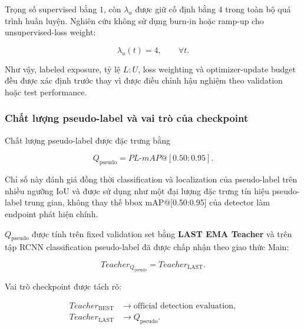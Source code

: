 \documentclass[pdflatex,sn-mathphys-num]{sn-jnl}%
\theoremstyle{thmstyleone}%
\theoremstyle{thmstyletwo}%
\theoremstyle{thmstylethree}%
\begin{document}
Trọng số supervised bằng \(1\), còn \(\lambda_u\) được giữ cố định bằng
\(4\) trong toàn bộ quá trình huấn luyện. Nghiên cứu không sử dụng burn-in
hoặc ramp-up cho unsupervised-loss weight:

\begin{equation}
\lambda_u(t)=4,
\qquad
\forall t.
\label{eq:ssl_constant_unsupervised_weight}
\end{equation}

Như vậy, labeled exposure, tỷ lệ \(L:U\), loss weighting và
optimizer-update budget đều được xác định trước thay vì được điều chỉnh hậu
nghiệm theo validation hoặc test performance.

\subsubsection{Chất lượng pseudo-label và vai trò của checkpoint}
\label{subsubsec:pseudo_label_quality}
\label{subsubsec:qpseudo_checkpoint}

Chất lượng pseudo-label được đặc trưng bằng

\begin{equation}
Q_{\mathrm{pseudo}}
=
PL\text{-}mAP@[0.50:0.95].
\label{eq:pseudo_quality_metric}
\end{equation}

Chỉ số này đánh giá đồng thời classification và localization của
pseudo-label trên nhiều ngưỡng IoU và được sử dụng như một đại lượng đặc trưng tín hiệu pseudo-label trung gian, không thay thế bbox mAP@[0.50:0.95] của detector làm endpoint
phát hiện chính.

\(Q_{\mathrm{pseudo}}\) được tính trên fixed validation set bằng
\textbf{LAST EMA Teacher} và trên tập RCNN classification pseudo-label đã
được chấp nhận theo giao thức Main:

\begin{equation}
Teacher_{Q_{\mathrm{pseudo}}}
=
Teacher_{\mathrm{LAST}}.
\label{eq:qpseudo_last_teacher}
\end{equation}

Vai trò checkpoint được tách rõ:

\begin{equation}
\begin{aligned}
Teacher_{\mathrm{BEST}}
&\longrightarrow
\text{official detection evaluation},\\
Teacher_{\mathrm{LAST}}
&\longrightarrow
Q_{\mathrm{pseudo}}.
\end{aligned}
\label{eq:ssl_best_last_teacher_roles}
\end{equation}
\end{document}
